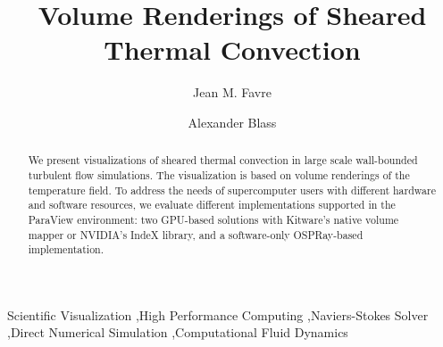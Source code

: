 \documentclass[final,5p,times,twocolumn]{elsarticle}
\begin{document}
\begin{frontmatter}



\title{Volume Renderings of Sheared Thermal Convection}


\author[CSCS]{Jean M. Favre}
\author[Twente]{Alexander Blass}

\address[CSCS]{Swiss National Supercomputing Center (CSCS), Via Trevano 131, CH-6900 Lugano, Switzerland}
\address[Twente]{Physics of Fluids Group, Max Planck Center for Complex Fluid Dynamics,
J. M. Burgers Center for Fluid Dynamics and MESA+ Research Institute,
Department of Science and Technology,
University of Twente, P.O. Box 217, 7500 AE Enschede, The Netherlands}

\begin{abstract}

We present visualizations of sheared thermal convection in large scale
wall-bounded turbulent flow simulations. The visualization is based on volume
renderings of the temperature field. To address the needs of supercomputer users
with different hardware and software resources, we evaluate different implementations
supported in the ParaView\cite{Ahrens2005} environment: two GPU-based solutions
with Kitware's native volume mapper or NVIDIA's IndeX library, and a software-only
OSPRay-based implementation.

\end{abstract}

\begin{keyword}

Scientific Visualization \sep High Performance Computing \sep Naviers-Stokes Solver \sep Direct Numerical Simulation \sep Computational Fluid Dynamics

\end{keyword}

\end{frontmatter}
\end{document}
